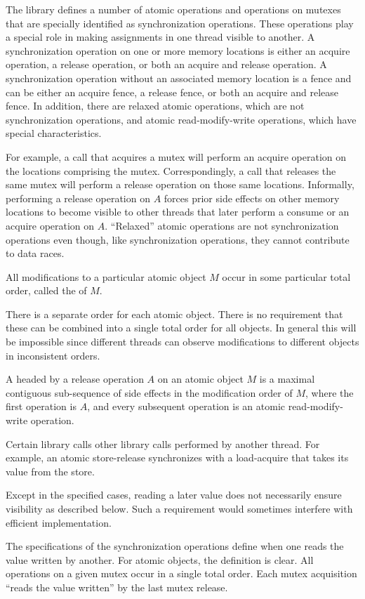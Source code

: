 \pnum
The library defines a number of atomic operations and
operations on mutexes that are specially identified as
synchronization operations. These operations play a special role in making
assignments in one thread visible to another. A synchronization operation on one
or more memory locations is either an acquire operation, a
release operation, or both an acquire and release operation. A synchronization
operation without an associated memory location is a fence and can be either an
acquire fence, a release fence, or both an acquire and release fence. In
addition, there are relaxed atomic operations, which are not synchronization
operations, and atomic read-modify-write operations, which have special
characteristics.
\begin{note}
For example, a call that acquires a mutex will
perform an acquire operation on the locations comprising the mutex.
Correspondingly, a call that releases the same mutex will perform a release
operation on those same locations. Informally, performing a release operation on
$A$ forces prior
%
side effects on other memory locations to become visible
to other threads that later perform a consume or an acquire operation on
$A$. ``Relaxed'' atomic operations are not synchronization operations even
though, like synchronization operations, they cannot contribute to data races.
\end{note}

\pnum
All modifications to a particular atomic object $M$ occur in some
particular total order, called the  of $M$.
\begin{note}
There is a separate order for each
atomic object. There is no requirement that these can be combined into a single
total order for all objects. In general this will be impossible since different
threads can observe modifications to different objects in inconsistent orders.
\end{note}

\pnum
A  headed
by a release operation $A$ on an atomic object $M$
is a maximal contiguous sub-sequence of
%
side effects in the modification order of $M$,
where the first operation is $A$, and
every subsequent operation is an atomic read-modify-write operation.

\pnum
Certain library calls  other library calls performed by
another thread. For example, an atomic store-release synchronizes with a
load-acquire that takes its value from the store.
\begin{note}
Except in the specified cases, reading a later value does not
necessarily ensure visibility as described below. Such a requirement would
sometimes interfere with efficient implementation.
\end{note}
\begin{note}
The
specifications of the synchronization operations define when one reads the value
written by another. For atomic objects, the definition is clear. All operations
on a given mutex occur in a single total order. Each mutex acquisition ``reads
the value written'' by the last mutex release.
\end{note}


